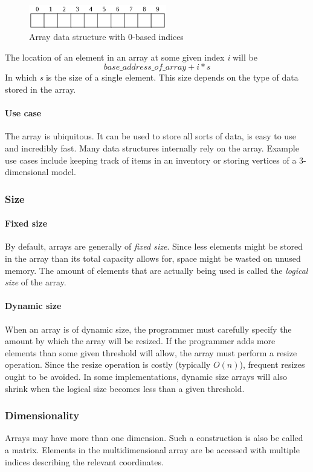 \documentclass{article}
\begin{document}
\begin{figure}[H]
  \centering
  \includegraphics[width=6cm]{array}
  \caption{Array data structure with 0-based indices}
\end{figure}

The location of an element in an array at some given index {\em i} will be
\[base\_address\_of\_array + i * s\]
In which {\em s} is the size of a single element. This size depends on the type of data stored in the array.

\paragraph{Use case}
The array is ubiquitous. It can be used to store all sorts of data, is easy to use and incredibly fast. Many data
structures internally rely on the array. Example use cases include keeping track of items in an inventory or storing vertices of
a 3-dimensional model.

\subsubsection{Size}
\paragraph{Fixed size}
By default, arrays are generally of {\em fixed size}. Since less elements might be stored in the array than its total
capacity allows for, space might be wasted on unused memory. The amount of elements that are actually being used is
called the {\em logical size} of the array.

\paragraph{Dynamic size}
When an array is of dynamic size, the programmer must carefully specify the amount by which the array will be resized.
If the programmer adds more elements than some given threshold will allow, the array must perform a resize operation.
Since the resize operation is costly (typically \(O(n)\)), frequent resizes ought to be avoided. In some implementations,
dynamic size arrays will also shrink when the logical size becomes less than a given threshold.

\subsubsection{Dimensionality}
Arrays may have more than one dimension. Such a construction is also be called a matrix. Elements in the multidimensional
array are be accessed with multiple indices describing the relevant coordinates.
\end{document}
